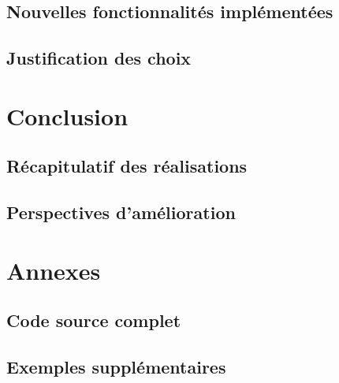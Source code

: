\documentclass{article}
\begin{document}
\subsection*{Nouvelles fonctionnalités implémentées}
\subsection*{Justification des choix}

\section*{Conclusion}
\subsection*{Récapitulatif des réalisations}
\subsection*{Perspectives d'amélioration}

\section*{Annexes}
\subsection*{Code source complet}
\subsection*{Exemples supplémentaires}
\end{document}
